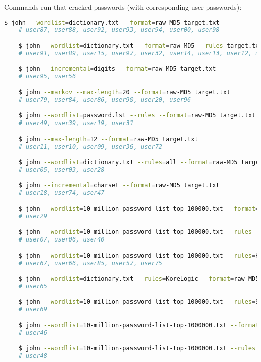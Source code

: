 \documentclass[12pt]{exam}
\begin{document}
\noindent
Commands run that cracked passwords (with corresponding user passwords):
\begin{lstlisting}[language=bash]
    $ john --wordlist=dictionary.txt --format=raw-MD5 target.txt 
    # user87, user88, user92, user93, user94, user00, user98

    $ john --wordlist=dictionary.txt --format=raw-MD5 --rules target.txt 
    # user91, user89, user15, user97, user32, user14, user13, user12, user99, user02, user01

    $ john --incremental=digits --format=raw-MD5 target.txt 
    # user95, user56

    $ john --markov --max-length=20 --format=raw-MD5 target.txt 
    # user79, user84, user86, user90, user20, user96

    $ john --wordlist=password.lst --rules --format=raw-MD5 target.txt 
    # user49, user39, user19, user31

    $ john --max-length=12 --format=raw-MD5 target.txt 
    # user11, user10, user09, user36, user72

    $ john --wordlist=dictionary.txt --rules=all --format=raw-MD5 target.txt 
    # user05, user03, user28

    $ john --incremental=charset --format=raw-MD5 target.txt 
    # user18, user74, user47

    $ john --wordlist=10-million-password-list-top-100000.txt --format=raw-MD5 target.txt 
    # user29

    $ john --wordlist=10-million-password-list-top-100000.txt --rules --format=raw-MD5 target.txt 
    # user07, user06, user40

    $ john --wordlist=10-million-password-list-top-100000.txt --rules=KoreLogic --format=raw-MD5 target.txt 
    # user67, user66, user85, user57, user75

    $ john --wordlist=dictionary.txt --rules=KoreLogic --format=raw-MD5 target.txt 
    # user65

    $ john --wordlist=10-million-password-list-top-100000.txt --rules=Single --format=raw-MD5 target.txt 
    # user69

    $ john --wordlist=10-million-password-list-top-1000000.txt --format=raw-MD5 target.txt 
    # user46

    $ john --wordlist=10-million-password-list-top-1000000.txt --rules --format=raw-MD5 target.txt 
    # user48
\end{lstlisting}
\end{document}
